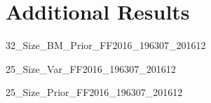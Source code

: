 
\section{Additional Results} \label{sec:addl_results}

\begin{landscape}
{32_Size_BM_Prior_FF2016_196307_201612}
\end{landscape}

{25_Size_Var_FF2016_196307_201612}

{25_Size_Prior_FF2016_196307_201612}
